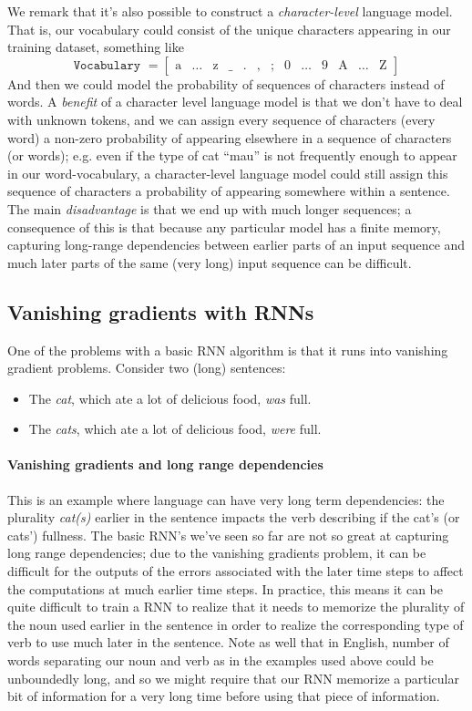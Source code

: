 \documentclass[12pt]{article}
\begin{document}
We remark that it's also possible to construct a \emph{character-level} language model. That is, our vocabulary could consist of the unique characters appearing in our training dataset, something like
\[
\texttt{Vocabulary } = \begin{bmatrix} \textrm{a} & \ldots & \textrm{z} & \textrm{\_} & \textrm{.} & \textrm{,} & \textrm{;} & 0 & \ldots & 9 & \textrm{A} & \ldots & \textrm{Z} \end{bmatrix}
\]
And then we could model the probability of sequences of characters instead of words. A \emph{benefit} of a character level language model is that we don't have to deal with unknown tokens, and we can assign every sequence of characters (every word) a non-zero probability of appearing elsewhere in a sequence of characters (or words); e.g. even if the type of cat ``mau'' is not frequently enough to appear in our word-vocabulary, a character-level language model could still assign this sequence of characters a probability of appearing somewhere within a sentence. The main \emph{disadvantage} is that we end up with much longer sequences; a consequence of this is that because any particular model has a finite memory, capturing long-range dependencies between earlier parts of an input sequence and much later parts of the same (very long) input sequence can be difficult.

\subsection{Vanishing gradients with RNNs}
One of the problems with a basic RNN algorithm is that it runs into vanishing gradient problems. Consider two (long) sentences:
\begin{itemize}
\item The \emph{cat}, which ate a lot of delicious food, \emph{was} full.
\item The \emph{cats}, which ate a lot of delicious food, \emph{were} full.
\end{itemize}
\paragraph{Vanishing gradients and long range dependencies}
This is an example where language can have very long term dependencies: the plurality \emph{cat(s)} earlier in the sentence impacts the verb describing if the cat's (or cats') fullness. The basic RNN's we've seen so far are not so great at capturing long range dependencies; due to the vanishing gradients problem, it can be difficult for the outputs of the errors associated with the later time steps to affect the computations at much earlier time steps. In practice, this means it can be quite difficult to train a RNN to realize that it needs to memorize the plurality of the noun used earlier in the sentence in order to realize the corresponding type of verb to use much later in the sentence. Note as well that in English, number of words separating our noun and verb as in the examples used above could be unboundedly long, and so we might require that our RNN memorize a particular bit of information for a very long time before using that piece of information.
\end{document}
